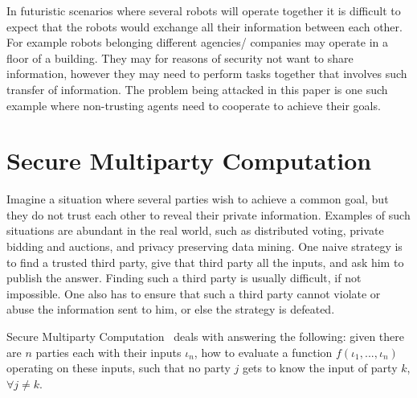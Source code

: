 In futuristic scenarios where several robots will operate together it is
difficult to expect that the robots would exchange all their information
between each other. For example robots belonging different agencies/
companies may operate in a floor of a building. They may for reasons of
security not want to share information, however they may need to perform
tasks together that involves such transfer of information. The problem
being attacked in this paper is one such example where non-trusting agents
need to cooperate to achieve their goals.

%
%
%


\section{Secure Multiparty Computation}
\label{sec:smpc}

Imagine a situation where several parties wish to achieve a common goal, but they do not trust
each other to reveal their private information. Examples of such situations are abundant in the
real world, such as distributed voting, private bidding and auctions, and privacy preserving data 
mining. One naive strategy is to find a trusted third party, give that third 
party all the inputs, and ask him to publish the answer. Finding such a third party is usually
difficult, if not impossible. One also has to ensure that such a third party cannot violate 
or abuse the information sent to him, or else the strategy is defeated.

Secure Multiparty Computation~\cite{GMW87:HtPaMG} deals with answering the following:
given there are $n$ parties each with their inputs $\iota_{n}$, how to evaluate a function 
$f(\iota_{1},...,\iota_{n})$ operating on these inputs, such that no party $j$ gets to know 
the input of party $k$, $\forall j \neq k$. 

